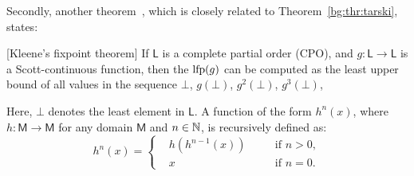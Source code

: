 Secondly, another theorem~\cite{kleene52}, which is closely
related to Theorem~\ref{bg:thr:tarski}, states:
\begin{theorem}
    \textup{[Kleene's fixpoint theorem]}
    If $\mathsf{L}$ is a complete partial order (CPO)\footnotemark[2],
    and $g: \mathsf{L} \to \mathsf{L}$ is a Scott-continuous function,
    then the $\operatorname{\mathrm{lfp}} (g)$ can be computed as the least upper bound of all
    values in the sequence $\bot$, $g(\bot)$, $g^2(\bot)$, $g^3(\bot)$,
    \textellipsis{}\label{bg:thr:kleene}
\end{theorem}
Here, $\bot$ denotes the least element in $\mathsf{L}$.  A function of the form
$h^n(x)$, where $h: \mathsf{M} \to \mathsf{M}$ for any domain $\mathsf{M}$ and
$n \in \mathbb{N}$, is recursively defined as:
\begin{equation}
    h^n(x) = \left\{
        \begin{aligned}
            & h(h^{n-1}(x)) \quad && \text{if~} n > 0, \\
            & x && \text{if~} n = 0.
        \end{aligned}
    \right.
\end{equation}

